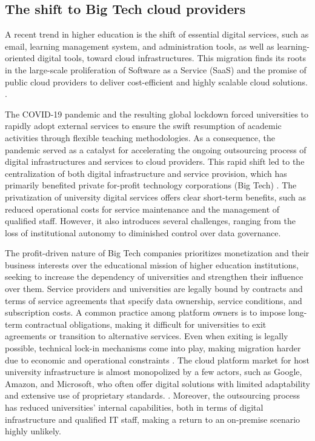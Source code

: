 \subsection{The shift to Big Tech cloud providers}
A recent trend in higher education is the shift of essential digital services, such as email, learning management system, and administration tools, as well as learning-oriented digital tools, toward cloud infrastructures. This migration finds its roots in the large-scale proliferation of Software as a Service (SaaS) and the promise of public cloud providers to deliver cost-efficient and highly scalable cloud solutions. \cite{fiebig_heads_2023}.

The COVID-19 pandemic and the resulting global lockdown forced universities to rapidly adopt external services to ensure the swift resumption of academic activities through flexible teaching methodologies. As a consequence, the pandemic served as a catalyst for accelerating the ongoing outsourcing process of  digital infrastructures and services to cloud providers. This rapid shift led to the centralization of both digital infrastructure and service provision, which has primarily benefited private for-profit technology corporations (Big Tech) \cite{angeli_conceptualising_2022}. The privatization of university digital services offers clear short-term benefits, such as reduced operational costs for service maintenance and the management of qualified staff. However, it also introduces several challenges, ranging from the loss of institutional autonomy to diminished control over data governance.

The profit-driven nature of Big Tech companies prioritizes monetization and their business interests over the educational mission of higher education institutions, seeking to increase the dependency of universities and strengthen their influence over them. Service providers and universities are legally bound by contracts and terms of service agreements that specify data ownership, service conditions, and subscription costs. A common practice among platform owners is to impose long-term contractual obligations, making it difficult for universities to exit agreements or transition to alternative services. Even when exiting is legally possible, technical lock-in mechanisms come into play, making migration harder due to economic and operational constraints \cite{komljenovic_rise_2021}. The cloud platform market for host university infrastructure is almost monopolized by a few actors, such as Google, Amazon, and Microsoft, who often offer digital solutions with limited adaptability and extensive use of proprietary standards. \cite{fiebig_heads_2023}. Moreover, the outsourcing process has reduced universities' internal capabilities, both in terms of digital infrastructure and qualified IT staff, making a return to an on-premise scenario highly unlikely.

